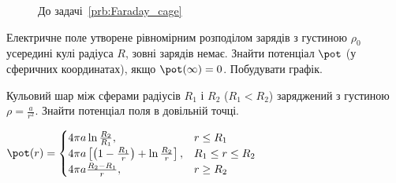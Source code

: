 \begin{figure}[h!]\centering
	\caption{До задачі~\ref{prb:Faraday_cage}}
	\label{}
\end{figure}


\begin{problem}
Електричне поле утворене рівномірним розподілом зарядів з густиною $\rho_0$ усередині кулі радіуса $R$, зовні зарядів немає. Знайти потенціал $\pot$ (у сферичних координатах), якщо  $\pot(\infty) = 0$. Побудувати графік.
\end{problem}

\begin{problem}
Кульовий шар між сферами радіусів $R_1$ і $R_2$ ($R_1 < R_2$) заряджений з густиною $\rho = \frac{a}{r^2}$. Знайти потенціал поля в довільній точці.
\begin{solution}
	$
		\pot(r) =
		\begin{cases}
			4\pi a\ln\frac{R_2}{R_1},                                                  & r \le R_1         \\
			4\pi a \left[ \left( 1- \frac{R_1}{r}\right)  + \ln\frac{R_2}{r} \right] , & R_1 \le r \le R_2 \\
			4\pi a \frac{R_2 - R_1}{r},                                                & r \ge R_2
		\end{cases}
	$
\end{solution}
\end{problem}

